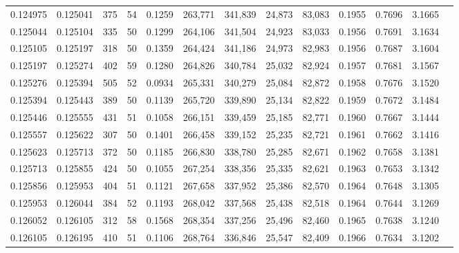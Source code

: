 \begin{tabular}{rrrrrrrrrrrrr}
0.124975 & 0.125041 &   375 &  54 &                                     0.1259 & 263,771 & 341,839 &  24,873 &  83,083 & 0.1955 & 0.7696 & 3.1665 \\
0.125044 & 0.125104 &   335 &  50 &                                     0.1299 & 264,106 & 341,504 &  24,923 &  83,033 & 0.1956 & 0.7691 & 3.1634 \\
0.125105 & 0.125197 &   318 &  50 &                                     0.1359 & 264,424 & 341,186 &  24,973 &  82,983 & 0.1956 & 0.7687 & 3.1604 \\
0.125197 & 0.125274 &   402 &  59 &                                     0.1280 & 264,826 & 340,784 &  25,032 &  82,924 & 0.1957 & 0.7681 & 3.1567 \\
0.125276 & 0.125394 &   505 &  52 &                                     0.0934 & 265,331 & 340,279 &  25,084 &  82,872 & 0.1958 & 0.7676 & 3.1520 \\
0.125394 & 0.125443 &   389 &  50 &                                     0.1139 & 265,720 & 339,890 &  25,134 &  82,822 & 0.1959 & 0.7672 & 3.1484 \\
0.125446 & 0.125555 &   431 &  51 &                                     0.1058 & 266,151 & 339,459 &  25,185 &  82,771 & 0.1960 & 0.7667 & 3.1444 \\
0.125557 & 0.125622 &   307 &  50 &                                     0.1401 & 266,458 & 339,152 &  25,235 &  82,721 & 0.1961 & 0.7662 & 3.1416 \\
0.125623 & 0.125713 &   372 &  50 &                                     0.1185 & 266,830 & 338,780 &  25,285 &  82,671 & 0.1962 & 0.7658 & 3.1381 \\
0.125713 & 0.125855 &   424 &  50 &                                     0.1055 & 267,254 & 338,356 &  25,335 &  82,621 & 0.1963 & 0.7653 & 3.1342 \\
0.125856 & 0.125953 &   404 &  51 &                                     0.1121 & 267,658 & 337,952 &  25,386 &  82,570 & 0.1964 & 0.7648 & 3.1305 \\
0.125953 & 0.126044 &   384 &  52 &                                     0.1193 & 268,042 & 337,568 &  25,438 &  82,518 & 0.1964 & 0.7644 & 3.1269 \\
0.126052 & 0.126105 &   312 &  58 &                                     0.1568 & 268,354 & 337,256 &  25,496 &  82,460 & 0.1965 & 0.7638 & 3.1240 \\
0.126105 & 0.126195 &   410 &  51 &                                     0.1106 & 268,764 & 336,846 &  25,547 &  82,409 & 0.1966 & 0.7634 & 3.1202 \\

\end{tabular}
